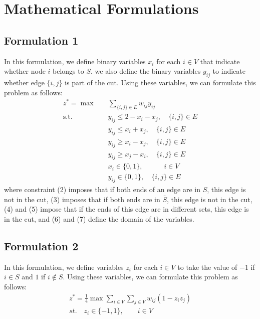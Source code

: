 \documentclass[12pt]{article}
\theoremstyle{plain}
\theoremstyle{definition}
\begin{document}
\section{Mathematical Formulations}\label{sec:Formulations}
\subsection{Formulation 1}\label{subsec:Formulation1}
In this formulation, we define binary variables $x_{i}$ for each $i \in V$ that indicate whether node $i$ belongs to $S$. we also define the binary variables $y_{ij}$ to indicate whether edge $\lbrace i,j \rbrace$ is part of the cut.
Using these variables, we can formulate this problem as follows:
\begin{align}
     z^* = \max \quad &\sum_{\lbrace i,j\rbrace \in E} w_{ij}y_{ij} \\
     \text{s.t.}\quad &y_{ij} \leq 2 - x_i - x_j,\quad \lbrace i,j \rbrace \in E \\
      &y_{ij} \leq x_i + x_j,\quad \lbrace i,j \rbrace \in E \\
       &y_{ij} \geq x_i - x_j,\quad \lbrace i,j \rbrace \in E \\ 
       &y_{ij} \geq x_j - x_i,\quad \lbrace i,j \rbrace \in E \\ 
       &x_i \in \lbrace 0,1 \rbrace, \quad \quad \quad i \in V \\
        &y_{ij} \in \lbrace 0,1 \rbrace, \quad \lbrace i,j \rbrace \in E
\end{align}
where constraint (2) imposes that if both ends of an edge are in $S$, this edge is not in the cut, (3) imposes that if both ends are in $\bar{S}$, this edge is not in the cut, (4) and (5) impose that if the ends of this edge are in different sets, this edge is in the cut, and (6) and (7) define the domain of the variables. 
\subsection{Formulation 2}\label{subsec:Forulation2}
In this formulation, we define variables $z_i$ for each $i \in V$ to take the value of $-1$ if $i \in S$ and $1$ if $i \notin S$. Using these variables, we can formulate this problem as follows:
\begin{align}
     z^* = \frac{1}{4}\max \sum_{i \in V} \sum_{j \in V} w_{ij} (1 - z_i z_j) \\ st.\quad z_i \in \lbrace -1,1 \rbrace, \quad \quad i \in V 
\end{align}
\end{document}
